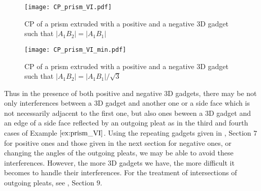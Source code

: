 \documentclass[11pt]{amsart}
\numberwithin{equation}{section}
\numberwithin{theorem}{section}
\newcommand{\norm}[1]{\ensuremath{\left| #1 \right|}}
\begin{document}
\begin{figure}[htbp]
\addtocounter{theorem}{1}
\centering\texttt{[image: CP\_prism\_VI.pdf]}
    \caption{CP of a prism extruded with a positive and a negative $3$D gadget such that $\norm{A_1 B_2}=\norm{A_1 B_1}$}
    \label{fig:CP_prism_VI}
\end{figure}
\begin{figure}[htbp]
\addtocounter{theorem}{1}
\centering\texttt{[image: CP\_prism\_VI\_min.pdf]}
    \caption{CP of a prism extruded with a positive and a negative $3$D gadget such that $\norm{A_1 B_2}=\norm{A_1 B_1}/\sqrt{3}$}
    \label{fig:CP_prism_VI_min}
\end{figure}
Thus in the presence of both positive and negative $3$D gadgets,
there may be not only interferences between a $3$D gadget and another one or a side face which is not necessarily adjacent to the first one,
but also ones beween a $3$D gadget and an edge of a side face reflected by an outgoing pleat as in the third and fourth cases of Example $\ref{ex:prism_VI}$.
Using the repeating gadgets given in \cite{Doi20}, Section $7$ for positive ones and those given in the next section for negative ones,
or changing the angles of the outgoing pleats, we may be able to avoid these interferences.
However, the more $3$D gadgets we have, the more difficult it becomes to handle their interferences.
For the treatment of intersections of outgoing pleats, see \cite{Doi19}, Section $9$.
\end{document}
